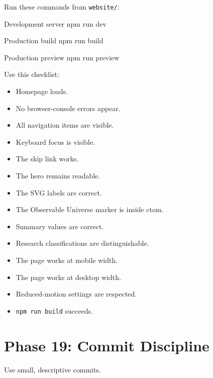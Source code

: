 \documentclass[11pt,letterpaper]{article}
\newcommand{\checkbox}{\(\square\)}
\newcommand{\filepath}[1]{\texttt{#1}}
\begin{document}
Run these commands from \filepath{website/}:

\begin{commandbox}{Development server}
npm run dev
\end{commandbox}

\begin{commandbox}{Production build}
npm run build
\end{commandbox}

\begin{commandbox}{Production preview}
npm run preview
\end{commandbox}

Use this checklist:

\begin{itemize}
    \item[\checkbox] Homepage loads.
    \item[\checkbox] No browser-console errors appear.
    \item[\checkbox] All navigation items are visible.
    \item[\checkbox] Keyboard focus is visible.
    \item[\checkbox] The skip link works.
    \item[\checkbox] The hero remains readable.
    \item[\checkbox] The SVG labels are correct.
    \item[\checkbox] The Observable Universe marker is inside ctom.
    \item[\checkbox] Summary values are correct.
    \item[\checkbox] Research classifications are distinguishable.
    \item[\checkbox] The page works at mobile width.
    \item[\checkbox] The page works at desktop width.
    \item[\checkbox] Reduced-motion settings are respected.
    \item[\checkbox] \texttt{npm run build} succeeds.
\end{itemize}

\section{Phase 19: Commit Discipline}

Use small, descriptive commits.
\end{document}
